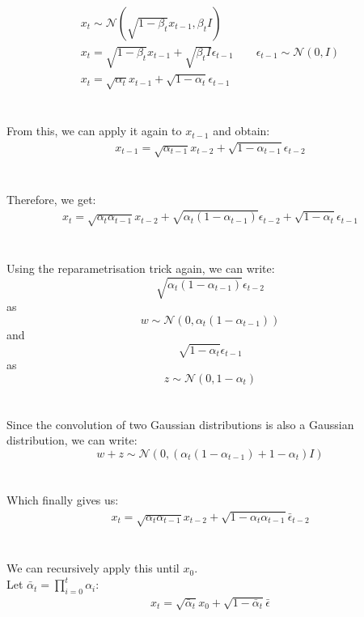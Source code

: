 \documentclass{article}
\begin{document}
\begin{gather*}
  x_t \sim \mathcal{N}\left(\sqrt{1 - \beta_t} x_{t-1}, \beta_t I\right) \\
  x_t = \sqrt{1 - \beta_t} x_{t-1} + \sqrt{\beta_t I} \epsilon_{t-1} \qquad \epsilon_{t - 1} \sim \mathcal{N}\left(0, I\right) \\
  x_t = \sqrt{\alpha_t} x_{t-1} + \sqrt{1 - \alpha_t} \epsilon_{t - 1}
\end{gather*}
\\\\
From this, we can apply it again to $x_{t-1}$ and obtain:
\begin{gather*}
  x_{t-1} = \sqrt{\alpha_{t-1}} x_{t-2} + \sqrt{1 - \alpha_{t-1}} \epsilon_{t - 2}
\end{gather*}
\\\\
Therefore, we get:
\begin{gather*}
  x_t = \sqrt{\alpha_t \alpha_{t-1}} x_{t-2} + \sqrt{\alpha_t\left(1 - \alpha_{t-1}\right)} \epsilon_{t - 2} + \sqrt{1 - \alpha_t} \epsilon_{t - 1}
\end{gather*}
\\\\
Using the reparametrisation trick again, we can write:
$$\sqrt{\alpha_t\left(1 - \alpha_{t-1}\right)} \epsilon_{t - 2}$$ 
as 
$$w \sim \mathcal{N}\left(0, \alpha_t\left(1 - \alpha_{t-1}\right)\right)$$
and
$$\sqrt{1 - \alpha_t} \epsilon_{t - 1}$$
as
$$z \sim \mathcal{N}\left(0, 1 - \alpha_t\right)$$
\\\\
Since the convolution of two Gaussian distributions is also a Gaussian distribution, we can write:
$$w + z \sim \mathcal{N}\left(0, \left(\alpha_t\left(1 - \alpha_{t-1}\right) + 1 - \alpha_t\right)I\right)$$
\\\\
Which finally gives us:
\begin{gather*}
  x_t = \sqrt{\alpha_t \alpha_{t-1}} x_{t-2} + \sqrt{1 - \alpha_t \alpha_{t-1}} \bar{\epsilon}_{t - 2}
\end{gather*}
\\\\
We can recursively apply this until $x_0$. \\
Let $\bar{\alpha}_t = \prod_{i=0}^{t}{\alpha_i}$:
\begin{gather}
  x_t = \sqrt{\bar{\alpha}_t} x_0 + \sqrt{1 - \bar{\alpha}_t} \bar{\epsilon} \label{eq:3}
\end{gather}
\\\\
\end{document}
